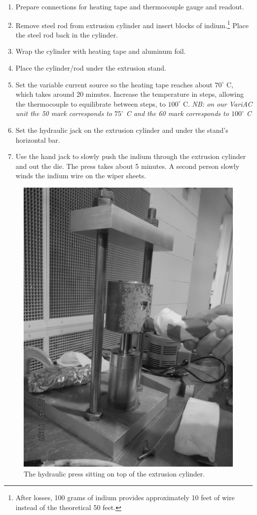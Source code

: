 \begin{enumerate}
\item Prepare connections for heating tape and thermocouple gauge and readout.
\item Remove steel rod from extrusion cylinder and insert blocks of indium.\footnote{After losses, 100 grams of indium provides approximately 10 feet of wire instead of the theoretical 50 feet.}  Place the steel rod back in the cylinder.
\item Wrap the cylinder with heating tape and aluminum foil.
\item Place the cylinder/rod under the extrusion stand.
\item Set the variable current source so the heating tape reaches about $70^\circ$ C, which takes around 20 minutes.  Increase the temperature in steps, allowing the thermocouple to equilibrate between steps, to $100 ^\circ$ C.  \textit{NB: on our VariAC unit the 50 mark corresponds to $75 ^\circ$ C and the 60 mark corresponds to $100^\circ$ C}
\item Set the hydraulic jack on the extrusion cylinder and under the stand's horizontal bar.
\item Use the hand jack to slowly push the indium through the extrusion cylinder and out the die.  The press takes about 5 minutes.  A second person slowly winds the indium wire on the wiper sheets. 
\end{enumerate}


\begin{figure}
 \centering
 \includegraphics[scale=0.75]{img/extruder-demo.png}
 \caption{The hydraulic press sitting on top of the extrusion cylinder.}
 \label{fig:extruder-demo}
\end{figure}


